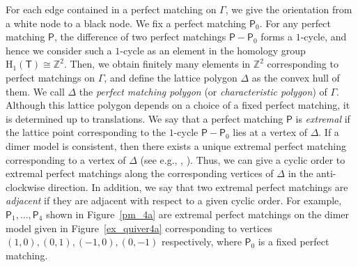 \documentclass[ALCO,ThmDefs,Unicode]{cedram}
\newcommand{\rmH}{\mathrm{H}}
\newcommand{\ZZ}{\mathbb{Z}}
\newcommand{\sfP}{\mathsf{P}}
\newcommand{\sfT}{\mathsf{T}}
\begin{document}
For each edge contained in a perfect matching on $\Gamma$, we give the orientation from a white node to a black node. We fix a perfect matching $\sfP_0$. For any perfect matching $\sfP$, the difference of two perfect matchings $\sfP-\sfP_0$ forms a $1$-cycle, and hence we consider such a $1$-cycle as an element in the homology group $\rmH_1(\sfT)\cong\ZZ^2$. Then, we obtain finitely many elements in $\ZZ^2$ corresponding to perfect matchings on $\Gamma$, and define the lattice polygon $\Delta$ as the convex hull of them. We call $\Delta$ the \emph{perfect matching polygon} (or \emph{characteristic polygon}) of $\Gamma$. Although this lattice polygon depends on a choice of a fixed perfect matching, it is determined up to translations. We say that a perfect matching $\sfP$ is \emph{extremal} if the lattice point corresponding to the $1$-cycle $\sfP-\sfP_0$ lies at a vertex of $\Delta$. If a dimer model is consistent, then there exists a unique extremal perfect matching corresponding to a vertex of $\Delta$ (see e.g., \cite[Corollary~4.27]{Bro}, \cite[Proposition~9.2]{IU2}). Thus, we can give a cyclic order to extremal perfect matchings along the corresponding vertices of $\Delta$ in the anti-clockwise direction. In addition, we say that two extremal perfect matchings are \emph{adjacent} if they are adjacent with respect to a given cyclic order. For example, $\sfP_1,\dots,\sfP_4$ shown in Figure~\ref{pm_4a} are extremal perfect matchings on the dimer model given in Figure~\ref{ex_quiver4a} corresponding to vertices $(1,0),(0,1),(-1,0),(0,-1)$ respectively, where $\sfP_0$ is a fixed perfect matching.
\end{document}
